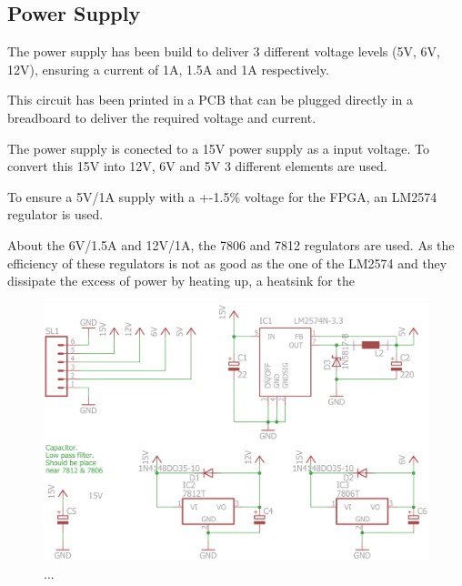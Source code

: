
\subsection{Power Supply}
The power supply has been build to deliver 3 different voltage levels (5V, 6V, 12V), ensuring a current of 1A, 1.5A and 1A respectively.

This circuit has been printed in a PCB that can be plugged directly in a breadboard to deliver the required voltage and current.

The power supply is conected to a 15V power supply as a input voltage. To convert this 15V into 12V, 6V and 5V 3 different elements are used.

To ensure a 5V/1A supply with a +-1.5\% voltage for the FPGA, an LM2574 regulator is used. 

About the 6V/1.5A and 12V/1A, the 7806 and 7812 regulators are used. As the efficiency of these regulators is not as good as the one of the LM2574 and they dissipate the excess of power by heating up, a heatsink for the 


\begin{figure}[H]
\centering 
\includegraphics[width = 0.4 \textwidth]{images/powersupply_schematics}
\caption{...}
\label{fig:...}
\end{figure}